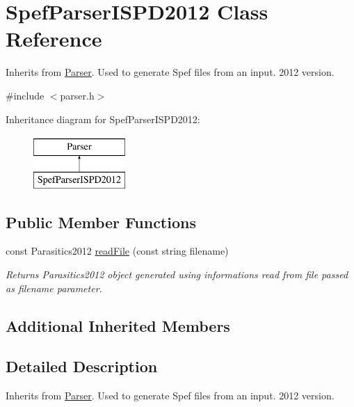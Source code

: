 \hypertarget{classSpefParserISPD2012}{\section{Spef\-Parser\-I\-S\-P\-D2012 Class Reference}
\label{classSpefParserISPD2012}
}


Inherits from \hyperlink{classParser}{Parser}. Used to generate Spef files from an input. 2012 version.  




{\ttfamily \#include $<$parser.\-h$>$}

Inheritance diagram for Spef\-Parser\-I\-S\-P\-D2012\-:\begin{figure}[H]
\begin{center}
\leavevmode
\includegraphics[height=2.000000cm]{classSpefParserISPD2012}
\end{center}
\end{figure}
\subsection*{Public Member Functions}
\begin{DoxyCompactItemize}
\item 
const Parasitics2012 \hyperlink{classSpefParserISPD2012_a130209fe17a1d791cd03543304e48d5e}{read\-File} (const string filename)
\begin{DoxyCompactList}\small\item\em Returns Parasitics2012 object generated using informations read from file passed as filename parameter. \end{DoxyCompactList}\end{DoxyCompactItemize}
\subsection*{Additional Inherited Members}


\subsection{Detailed Description}
Inherits from \hyperlink{classParser}{Parser}. Used to generate Spef files from an input. 2012 version. 

